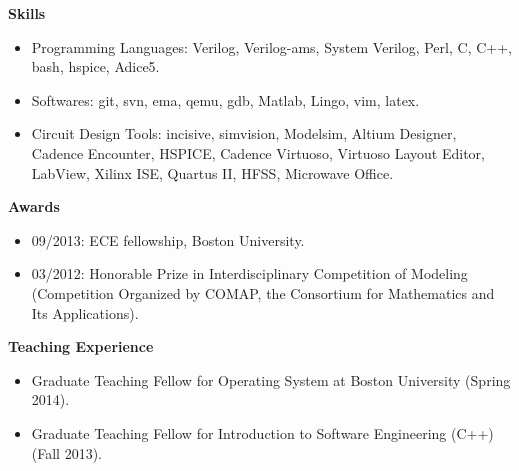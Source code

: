 \documentclass[]{article}
\begin{document}
\noindent \textbf{Skills}
\begin{itemize}
\item Programming Languages:  Verilog, Verilog-ams, System Verilog, Perl, C,
C++, bash, hspice, Adice5.
\item Softwares:  git, svn, ema, qemu, gdb, Matlab, Lingo, vim, latex.
\item Circuit Design Tools:  incisive, simvision, Modelsim, Altium Designer,
Cadence Encounter, HSPICE, Cadence Virtuoso, Virtuoso Layout Editor, LabView,
Xilinx ISE, Quartus II, HFSS, Microwave Office. 

\end{itemize}
\noindent \textbf{Awards}
\begin{itemize}
\item 09/2013:  ECE fellowship, Boston University.

\item 03/2012:  Honorable Prize in Interdisciplinary Competition of Modeling
(Competition Organized by COMAP, the Consortium for Mathematics and Its
Applications).



\end{itemize}

\noindent \textbf{Teaching Experience}
\begin{itemize}
\item Graduate Teaching Fellow for Operating System at Boston University
(Spring 2014).
\item Graduate Teaching Fellow for Introduction to Software Engineering (C++) (Fall
2013).
\end{itemize}
\end{document}
